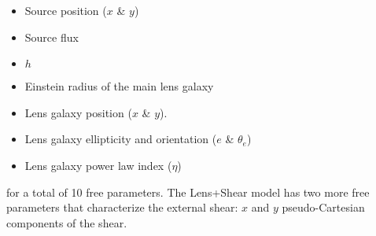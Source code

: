 \begin{itemize}
\item Source position ($x$ \& $y$)
\item Source flux
\item $h$
\item Einstein radius of the main lens galaxy
\item Lens galaxy position ($x$ \& $y$).
\item Lens galaxy ellipticity and orientation ($e$ \& $\theta_e$)
\item Lens galaxy power law index ($\eta$)
\end{itemize}
for a total of 10 free parameters.
The Lens+Shear model has two more free parameters that characterize the external shear: $x$ and $y$ pseudo-Cartesian components of the shear.